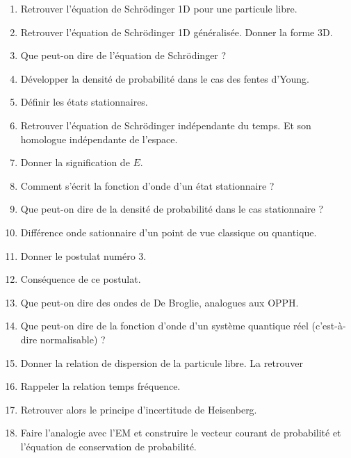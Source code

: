 \documentclass[a4paper, 11pt, hidelinks]{article}
\begin{document}
\begin{enumerate}
    \item Retrouver l'équation de Schrödinger 1D pour une particule libre. \cite{Chapitre21}
    \item Retrouver l'équation de Schrödinger 1D généralisée. Donner la forme 3D. \cite{Chapitre21}
    \item Que peut-on dire de l'équation de Schrödinger ? \cite{Chapitre21}
    \item Développer la densité de probabilité dans le cas des fentes d'Young. \cite{Chapitre21}
    \item Définir les états stationnaires. \cite{Chapitre21}
    \item Retrouver l'équation de Schrödinger indépendante du temps. Et son homologue indépendante de l'espace. \cite{Chapitre21}
    \item Donner la signification de $E$. \cite{Chapitre21}
    \item Comment s'écrit la fonction d'onde d'un état stationnaire ? \cite{Chapitre21}
    \item Que peut-on dire de la densité de probabilité dans le cas stationnaire ? \cite{Chapitre21}
    \item Différence onde sationnaire d'un point de vue classique ou quantique. \cite{Chapitre21}
    \item Donner le postulat numéro 3. \cite{Chapitre21}
    \item Conséquence de ce postulat. \cite{Chapitre21}
    \item Que peut-on dire des ondes de De Broglie, analogues aux OPPH. \cite{Chapitre21}
    \item Que peut-on dire de la fonction d'onde d'un système quantique réel (c'est-à-dire normalisable) ? \cite{Chapitre21}
    \item Donner la relation de dispersion de la particule libre. La retrouver \cite{Chapitre21}
    \item Rappeler la relation temps fréquence. \cite{Chapitre21}
    \item Retrouver alors le principe d'incertitude de Heisenberg. \cite{Chapitre21}
    \item Faire l'analogie avec l'EM et construire le vecteur courant de probabilité et l'équation de conservation de probabilité. \cite{Chapitre21} 
\end{enumerate}

















\end{document}
